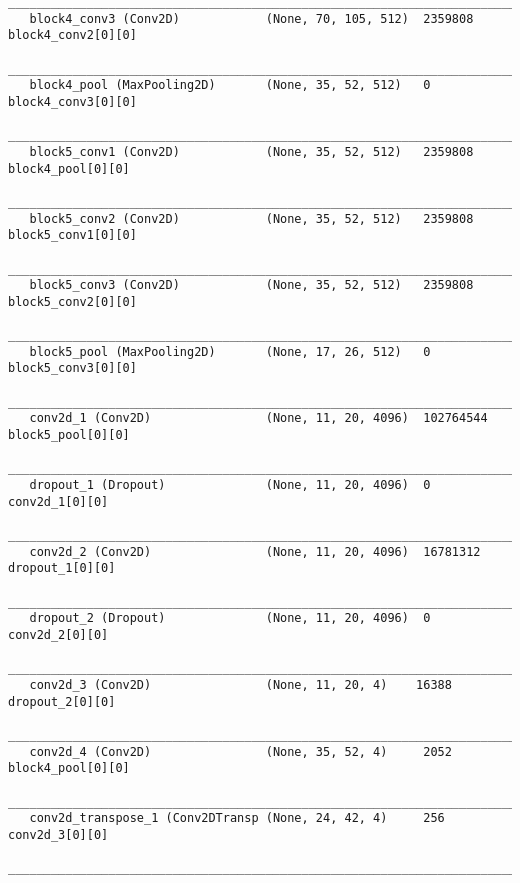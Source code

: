 \begin{Verbatim}[fontsize=\scriptsize]
   _______________________________________________________________________________________
   block4_conv3 (Conv2D)            (None, 70, 105, 512)  2359808     block4_conv2[0][0]               
   _______________________________________________________________________________________
   block4_pool (MaxPooling2D)       (None, 35, 52, 512)   0           block4_conv3[0][0]               
   _______________________________________________________________________________________
   block5_conv1 (Conv2D)            (None, 35, 52, 512)   2359808     block4_pool[0][0]                
   _______________________________________________________________________________________
   block5_conv2 (Conv2D)            (None, 35, 52, 512)   2359808     block5_conv1[0][0]               
   _______________________________________________________________________________________
   block5_conv3 (Conv2D)            (None, 35, 52, 512)   2359808     block5_conv2[0][0]               
   _______________________________________________________________________________________
   block5_pool (MaxPooling2D)       (None, 17, 26, 512)   0           block5_conv3[0][0]               
   _______________________________________________________________________________________
   conv2d_1 (Conv2D)                (None, 11, 20, 4096)  102764544   block5_pool[0][0]                
   _______________________________________________________________________________________
   dropout_1 (Dropout)              (None, 11, 20, 4096)  0           conv2d_1[0][0]                   
   _______________________________________________________________________________________
   conv2d_2 (Conv2D)                (None, 11, 20, 4096)  16781312    dropout_1[0][0]                  
   _______________________________________________________________________________________
   dropout_2 (Dropout)              (None, 11, 20, 4096)  0           conv2d_2[0][0]                   
   _______________________________________________________________________________________
   conv2d_3 (Conv2D)                (None, 11, 20, 4)    16388       dropout_2[0][0]                  
   _______________________________________________________________________________________
   conv2d_4 (Conv2D)                (None, 35, 52, 4)     2052        block4_pool[0][0]                
   _______________________________________________________________________________________
   conv2d_transpose_1 (Conv2DTransp (None, 24, 42, 4)     256         conv2d_3[0][0]                   
   ________________________________________________________________________________________

\end{Verbatim}
